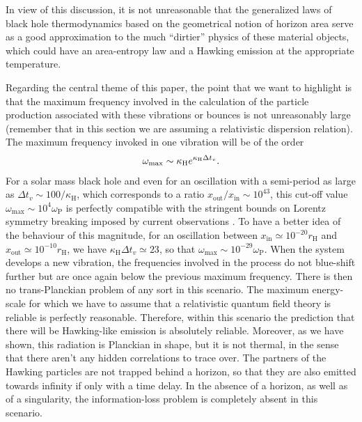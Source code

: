 \documentclass[11pt,a4paper]{article}
\begin{document}
In view of this discussion, it is not unreasonable
that the generalized laws of black hole
thermodynamics based on the  geometrical notion of horizon area serve as a good approximation to the much ``dirtier'' physics of these material objects, which could have an area-entropy law and a Hawking
emission at the appropriate temperature.
 
Regarding the central theme of this paper, the point that we want to highlight  is that the maximum frequency
involved in the calculation of the particle production associated with these
vibrations or bounces is not unreasonably large (remember that in this section
we are assuming a relativistic dispersion relation). The maximum frequency
invoked in one vibration will be of the order 
%
\begin{align}
\omega_{\rm max} \sim \kappa_\text{H} e^{\kappa_\text{H} \Delta t_v}.
\end{align}
%
For a solar mass black hole and even for an oscillation with a semi-period as large as $\Delta t_v \sim 100/\kappa_\text{H}$, which
corresponds to a ratio $x_\text{out}/x_\text{in} \sim10^{43}$, this cut-off
value $\omega_\text{max}\sim 10^4\omega_\text{P}$ is perfectly compatible with the
stringent bounds on Lorentz symmetry breaking imposed by current observations \cite{jacobson-liberati,liberati}.
To have a better idea of the behaviour of this magnitude, for an oscillation between
$x_\text{in}\simeq 10^{-20} r_\text{H}$ and $x_\text{out}\simeq 10^{-10}r_\text{H}$, we have
$\kappa_\text{H}\Delta t_v\simeq 23$, so that $\omega_\text{max}\sim
10^{-29}\omega_\text{P}$. 
%
When the system develops a new vibration, the frequencies involved
in the process do not blue-shift further but are once again below the previous maximum frequency. There is then no  trans-Planckian problem of any sort in this scenario. The maximum
energy-scale for which we have to assume that a relativistic quantum field
theory is reliable is perfectly reasonable. Therefore, within this scenario the
prediction that there will be Hawking-like emission is absolutely reliable. Moreover, as we have shown, this radiation is Planckian in shape, but it is not thermal, in the sense
that there aren't any hidden correlations to trace over. The partners of the Hawking particles are not trapped behind a horizon, so that they are also emitted towards infinity if only with a time delay. In the absence of a horizon, as well as of a singularity, the
information-loss problem is completely absent in this scenario.
\end{document}
